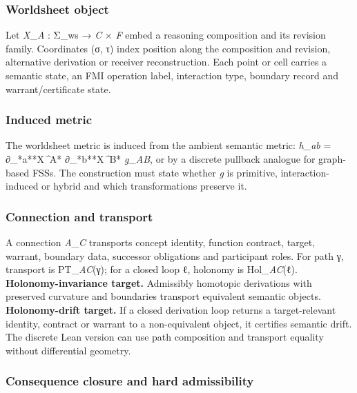 \hypertarget{worldsheet-object}{%
\subsubsection{Worldsheet object}\label{worldsheet-object}}

Let \emph{X}\_\emph{A} : Σ\_ws → \emph{C} × \emph{F} embed a reasoning
composition and its revision family. Coordinates (σ, τ) index position
along the composition and revision, alternative derivation or receiver
reconstruction. Each point or cell carries a semantic state, an FMI
operation label, interaction type, boundary record and
warrant/certificate state.

\hypertarget{induced-metric}{%
\subsubsection{Induced metric}\label{induced-metric}}

The worldsheet metric is induced from the ambient semantic metric:
\emph{h\_ab} = ∂\_*a**X\emph{\^{}}A* ∂\_*b**X\emph{\^{}}B* \emph{g\_AB},
or by a discrete pullback analogue for graph-based FSSs. The
construction must state whether \emph{g} is primitive,
interaction-induced or hybrid and which transformations preserve it.

\hypertarget{connection-and-transport}{%
\subsubsection{Connection and
transport}\label{connection-and-transport}}

A connection \emph{A}\_\emph{C} transports concept identity, function
contract, target, warrant, boundary data, successor obligations and
participant roles. For path γ, transport is PT\_\emph{A}\emph{C}(γ); for
a closed loop ℓ, holonomy is Hol\_\emph{A}\emph{C}(ℓ).
\textbf{Holonomy-invariance target.} Admissibly homotopic derivations
with preserved curvature and boundaries transport equivalent semantic
objects. \textbf{Holonomy-drift target.} If a closed derivation loop
returns a target-relevant identity, contract or warrant to a
non-equivalent object, it certifies semantic drift. The discrete Lean
version can use path composition and transport equality without
differential geometry.

\hypertarget{consequence-closure-and-hard-admissibility}{%
\subsubsection{Consequence closure and hard
admissibility}\label{consequence-closure-and-hard-admissibility}}

